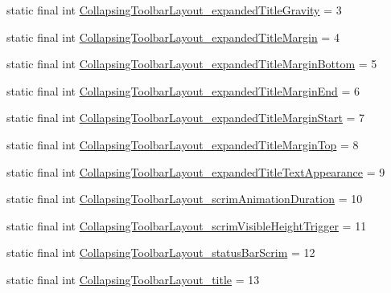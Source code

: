 \begin{DoxyCompactItemize}
\item 
static final int \mbox{\hyperlink{classandroid_1_1support_1_1design_1_1R_1_1styleable_a22ca6e930c13beba31f8d203d3fe975c}{Collapsing\+Toolbar\+Layout\+\_\+expanded\+Title\+Gravity}} = 3
\item 
static final int \mbox{\hyperlink{classandroid_1_1support_1_1design_1_1R_1_1styleable_a94ebf42f82b453a27b237b0bebf8ae72}{Collapsing\+Toolbar\+Layout\+\_\+expanded\+Title\+Margin}} = 4
\item 
static final int \mbox{\hyperlink{classandroid_1_1support_1_1design_1_1R_1_1styleable_a6b5972f1871c56095c3fd4dfd0d87d48}{Collapsing\+Toolbar\+Layout\+\_\+expanded\+Title\+Margin\+Bottom}} = 5
\item 
static final int \mbox{\hyperlink{classandroid_1_1support_1_1design_1_1R_1_1styleable_abf4153c9e38ee5d38f3f60f9ce772c61}{Collapsing\+Toolbar\+Layout\+\_\+expanded\+Title\+Margin\+End}} = 6
\item 
static final int \mbox{\hyperlink{classandroid_1_1support_1_1design_1_1R_1_1styleable_afd17a6349c12e66bd2ec7543b8aea927}{Collapsing\+Toolbar\+Layout\+\_\+expanded\+Title\+Margin\+Start}} = 7
\item 
static final int \mbox{\hyperlink{classandroid_1_1support_1_1design_1_1R_1_1styleable_ac20bf3c3187cbfe0e8d3d38f0f240bc7}{Collapsing\+Toolbar\+Layout\+\_\+expanded\+Title\+Margin\+Top}} = 8
\item 
static final int \mbox{\hyperlink{classandroid_1_1support_1_1design_1_1R_1_1styleable_a5810888dea70dffb7d52060a911d78aa}{Collapsing\+Toolbar\+Layout\+\_\+expanded\+Title\+Text\+Appearance}} = 9
\item 
static final int \mbox{\hyperlink{classandroid_1_1support_1_1design_1_1R_1_1styleable_a90a53847f02d35e4468e56f400cfed3a}{Collapsing\+Toolbar\+Layout\+\_\+scrim\+Animation\+Duration}} = 10
\item 
static final int \mbox{\hyperlink{classandroid_1_1support_1_1design_1_1R_1_1styleable_addcae54e0ba650d422a82a5ddbf35438}{Collapsing\+Toolbar\+Layout\+\_\+scrim\+Visible\+Height\+Trigger}} = 11
\item 
static final int \mbox{\hyperlink{classandroid_1_1support_1_1design_1_1R_1_1styleable_a9a2f53e59e0ce9c6cf463013300a02a4}{Collapsing\+Toolbar\+Layout\+\_\+status\+Bar\+Scrim}} = 12
\item 
static final int \mbox{\hyperlink{classandroid_1_1support_1_1design_1_1R_1_1styleable_ad1b550d16ea4dc77615ec73e00300c09}{Collapsing\+Toolbar\+Layout\+\_\+title}} = 13
\item 

\end{DoxyCompactItemize}
